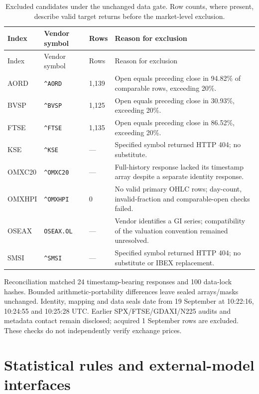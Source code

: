 \begin{longtable}{@{}>{\raggedright\arraybackslash}p{1.8cm}>{\raggedright\arraybackslash}p{2.3cm}p{1.2cm}>{\raggedright\arraybackslash}p{8.1cm}@{}}
\caption[All eight later-period exclusions]{Excluded candidates under the unchanged data gate. Row counts, where present, describe valid target returns before the market-level exclusion.}\label{tab:closure_exclusions}\\
\toprule Index & Vendor symbol & Rows & Reason for exclusion \\
\midrule
\endfirsthead
\toprule Index & Vendor symbol & Rows & Reason for exclusion \\
\midrule
\endhead
AORD & \texttt{\^{}AORD} & 1,139 & Open equals preceding close in 94.82\% of comparable rows, exceeding 20\%. \\
BVSP & \texttt{\^{}BVSP} & 1,125 & Open equals preceding close in 30.93\%, exceeding 20\%. \\
FTSE & \texttt{\^{}FTSE} & 1,135 & Open equals preceding close in 86.52\%, exceeding 20\%. \\
KSE & \texttt{\^{}KSE} & --- & Specified symbol returned HTTP 404; no substitute. \\
OMXC20 & \texttt{\^{}OMXC20} & --- & Full-history response lacked its timestamp array despite a separate identity response. \\
OMXHPI & \texttt{\^{}OMXHPI} & 0 & No valid primary OHLC rows; day-count, invalid-fraction and comparable-open checks failed. \\
OSEAX & \texttt{OSEAX.OL} & --- & Vendor identifies a GI series; compatibility of the valuation convention remained unresolved. \\
SMSI & \texttt{\^{}SMSI} & --- & Specified symbol returned HTTP 404; no substitute or IBEX replacement. \\
\bottomrule
\end{longtable}

Reconciliation matched 24 timestamp-bearing responses and 100 data-lock hashes. Bounded arithmetic-portability differences leave sealed arrays/masks unchanged. Identity, mapping and data seals date from 19 September at 10:22:16, 10:24:55 and 10:25:28 UTC. Earlier SPX/FTSE/GDAXI/N225 audits and metadata contact remain disclosed; acquired 1 September rows are excluded. These checks do not independently verify exchange prices.

\clearpage
\section{Statistical rules and external-model interfaces}

